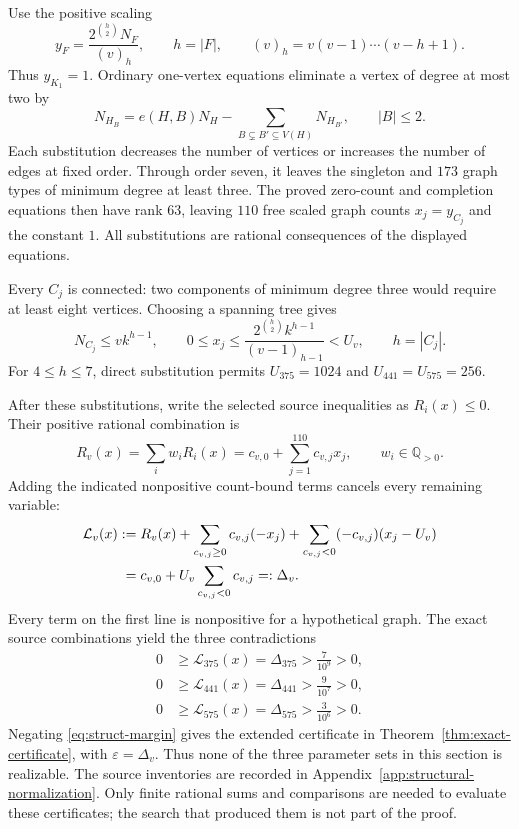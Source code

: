 \documentclass[11pt]{article}
\theoremstyle{remark}
\numberwithin{equation}{section}
\begin{document}
Use the positive scaling
\begin{equation}\label{eq:struct-scaled}
 y_F=\frac{2^{\binom h2}N_F}{(v)_h},\qquad h=|F|,
 \qquad (v)_h=v(v-1)\cdots(v-h+1).
\end{equation}
Thus $y_{K_1}=1$. Ordinary one-vertex equations eliminate a vertex
of degree at most two by
\[
 N_{H_B}=e(H,B)N_H-\sum_{B\subsetneq B'\subseteq V(H)}N_{H_{B'}},
 \qquad |B|\le2.
\]
Each substitution decreases the number of vertices or increases the
number of edges at fixed order. Through order seven, it leaves the
singleton and $173$ graph types of minimum degree at least three.
The proved zero-count and completion equations then have rank $63$,
leaving $110$ free scaled graph counts $x_j=y_{C_j}$ and the constant $1$.
All substitutions are rational consequences of the displayed equations.

Every $C_j$ is connected: two components of minimum degree three would
require at least eight vertices. Choosing a spanning tree gives
\[
 N_{C_j}\le vk^{h-1},\qquad
 0\le x_j\le
 \frac{2^{\binom h2}k^{h-1}}{(v-1)_{h-1}}<U_v,
 \qquad h=|C_j|.
\]
For $4\le h\le7$, direct substitution permits
$U_{375}=1024$ and $U_{441}=U_{575}=256$.

After these substitutions, write the selected source inequalities as
$R_i(x)\le0$. Their positive rational combination is
\[
 R_v(x)=\sum_iw_iR_i(x)
       =c_{v,0}+\sum_{j=1}^{110}c_{v,j}x_j,
 \qquad w_i\in\mathbb Q_{>0}.
\]
Adding the indicated nonpositive count-bound terms cancels every
remaining variable:
\begin{align}
 \mathcal L_v(x):={}&R_v(x)
   +\sum_{c_{v,j}\ge0}c_{v,j}(-x_j)
   +\sum_{c_{v,j}<0}(-c_{v,j})(x_j-U_v)\notag\\
 ={}&c_{v,0}+U_v\sum_{c_{v,j}<0}c_{v,j}=:\Delta_v.
 \label{eq:struct-margin}
\end{align}
Every term on the first line is nonpositive for a hypothetical graph.
The exact source combinations yield the three contradictions
\begin{equation}
 \begin{aligned}
 0&\ge\mathcal L_{375}(x)=\Delta_{375}>\frac7{10^9}>0,\\
 0&\ge\mathcal L_{441}(x)=\Delta_{441}>\frac9{10^7}>0,\\
 0&\ge\mathcal L_{575}(x)=\Delta_{575}>\frac3{10^6}>0.
 \end{aligned}
 \label{eq:struct-three-contradictions}
\end{equation}
Negating \eqref{eq:struct-margin} gives the extended certificate in
Theorem~\ref{thm:exact-certificate}, with $\varepsilon=\Delta_v$.
Thus none of the three parameter sets in this section is realizable.
The source inventories are recorded in Appendix~\ref{app:structural-normalization}.
Only finite rational sums and comparisons are needed to evaluate these
certificates; the search that produced them is not part of the proof.
\end{document}
